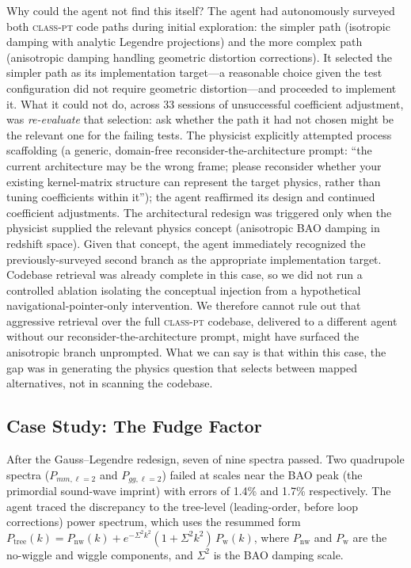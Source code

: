 \documentclass{article}
\newcommand{\classpt}{\textsc{class-pt}\xspace}
\begin{document}
Why could the agent not find this itself? The agent had autonomously surveyed both \classpt code paths during initial exploration: the simpler path (isotropic damping with analytic Legendre projections) and the more complex path (anisotropic damping handling geometric distortion corrections). It selected the simpler path as its implementation target---a reasonable choice given the test configuration did not require geometric distortion---and proceeded to implement it. What it could not do, across 33 sessions of unsuccessful coefficient adjustment, was \emph{re-evaluate} that selection: ask whether the path it had not chosen might be the relevant one for the failing tests. The physicist explicitly attempted process scaffolding (a generic, domain-free reconsider-the-architecture prompt: ``the current architecture may be the wrong frame; please reconsider whether your existing kernel-matrix structure can represent the target physics, rather than tuning coefficients within it''); the agent reaffirmed its design and continued coefficient adjustments. The architectural redesign was triggered only when the physicist supplied the relevant physics concept (anisotropic BAO damping in redshift space). Given that concept, the agent immediately recognized the previously-surveyed second branch as the appropriate implementation target. Codebase retrieval was already complete in this case, so we did not run a controlled ablation isolating the conceptual injection from a hypothetical navigational-pointer-only intervention. We therefore cannot rule out that aggressive retrieval over the full \classpt codebase, delivered to a different agent without our reconsider-the-architecture prompt, might have surfaced the anisotropic branch unprompted. What we can say is that within this case, the gap was in generating the physics question that selects between mapped alternatives, not in scanning the codebase.

\subsection{Case Study: The Fudge Factor}
\label{sec:fudge}

After the Gauss--Legendre redesign, seven of nine spectra passed. Two quadrupole spectra ($P_{mm,\ell=2}$ and $P_{gg,\ell=2}$) failed at scales near the BAO peak (the primordial sound-wave imprint) with errors of 1.4\% and 1.7\% respectively. The agent traced the discrepancy to the tree-level (leading-order, before loop corrections) power spectrum, which uses the resummed form $P_\mathrm{tree}(k) = P_\mathrm{nw}(k) + e^{-\Sigma^2 k^2}(1 + \Sigma^2 k^2)\,P_\mathrm{w}(k)$, where $P_\mathrm{nw}$ and $P_\mathrm{w}$ are the no-wiggle and wiggle components, and $\Sigma^2$ is the BAO damping scale.
\end{document}
